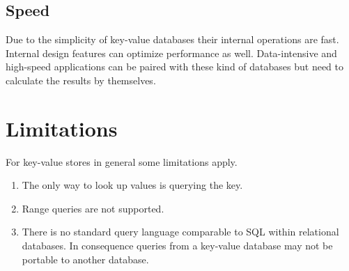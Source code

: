 \subsection{Speed}
Due to the simplicity of key-value databases their internal operations are fast.
Internal design features can optimize performance as well. Data-intensive and
high-speed applications can be paired with these kind of databases but need to
calculate the results by themselves\cite{fulmanskikeyvalue}.

\section{Limitations}
For key-value stores in general some limitations apply.
\begin{enumerate}
    \item The only way to look up values is querying the key.
    \item Range queries are not supported.
    \item There is no standard query language comparable to SQL within
    relational databases. In consequence queries from a key-value database may
    not be portable to another database.
\end{enumerate}
\cite{fulmanskikeyvalue}

